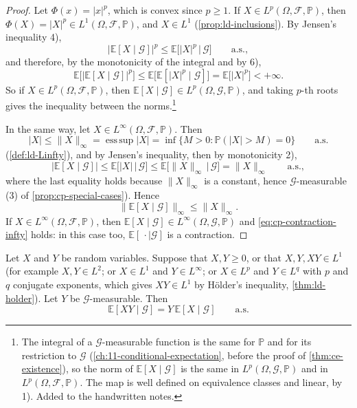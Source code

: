 \begin{proof}
Let $\Phi(x)=|x|^p$, which is convex since $p\ge1$. If $X\in L^p(\Omega,\mathcal F,\mathbb P)$, then
$\Phi(X)=|X|^p\in L^1(\Omega,\mathcal F,\mathbb P)$, and $X\in L^1$ (\cref{prop:ld-inclusions}). By
Jensen's inequality 4),
\[
  \big|\mathbb E[X\mid\mathcal G]\big|^p\le\mathbb E\big[|X|^p\,\big|\,\mathcal G\big]\qquad\text{a.s.},
\]
and therefore, by the monotonicity of the integral and by 6),
\[
  \mathbb E\big[|\mathbb E[X\mid\mathcal G]|^p\big]\le\mathbb E\big[\mathbb E[|X|^p\mid\mathcal G]\big]
  =\mathbb E\big[|X|^p\big]<+\infty .
\]
So if $X\in L^p(\Omega,\mathcal F,\mathbb P)$, then $\mathbb E[X\mid\mathcal G]\in L^p(\Omega,\mathcal G,\mathbb P)$,
and taking $p$-th roots gives the inequality between the norms.\footnote{The integral of a
$\mathcal G$-measurable function is the same for $\mathbb P$ and for its restriction to $\mathcal G$
(\cref{ch:11-conditional-expectation}, before the proof of \cref{thm:ce-existence}), so the norm of
$\mathbb E[X\mid\mathcal G]$ is the same in $L^p(\Omega,\mathcal G,\mathbb P)$ and in
$L^p(\Omega,\mathcal F,\mathbb P)$. The map is well defined on equivalence classes and linear,
by 1). Added to the handwritten notes.}

In the same way, let $X\in L^\infty(\Omega,\mathcal F,\mathbb P)$. Then
\[
  |X|\le\|X\|_\infty=\operatorname{ess\,sup}|X|=\inf\{M>0:\mathbb P(|X|>M)=0\}\qquad\text{a.s.}
\]
(\cref{def:ld-Linfty}), and by Jensen's inequality, then by monotonicity 2),
\[
  \big|\mathbb E[X\mid\mathcal G]\big|\le\mathbb E\big[|X|\,\big|\,\mathcal G\big]
  \le\mathbb E\big[\|X\|_\infty\,\big|\,\mathcal G\big]=\|X\|_\infty\qquad\text{a.s.},
\]
where the last equality holds because $\|X\|_\infty$ is a constant, hence $\mathcal G$-measurable
(3) of \cref{prop:cp-special-cases}). Hence
\begin{equation}\label{eq:cp-contraction-infty}
  \big\|\mathbb E[X\mid\mathcal G]\big\|_\infty\le\|X\|_\infty .
\end{equation}
If $X\in L^\infty(\Omega,\mathcal F,\mathbb P)$, then $\mathbb E[X\mid\mathcal G]\in L^\infty(\Omega,\mathcal G,\mathbb P)$
and \eqref{eq:cp-contraction-infty} holds: in this case too, $\mathbb E[\,\cdot\mid\mathcal G]$ is a
contraction.
\end{proof}

\begin{proposition}\label{prop:cp-taking-out}
Let $X$ and $Y$ be random variables. Suppose that $X,Y\ge0$, or that $X,Y,XY\in L^1$ (for example
$X,Y\in L^2$; or $X\in L^1$ and $Y\in L^\infty$; or $X\in L^p$ and $Y\in L^q$ with $p$ and $q$
conjugate exponents, which gives $XY\in L^1$ by H\"older's inequality, \cref{thm:ld-holder}). Let
$Y$ be $\mathcal G$-measurable. Then
\[
  \mathbb E[XY\mid\mathcal G]=Y\,\mathbb E[X\mid\mathcal G]\qquad\text{a.s.}
\]
\end{proposition}

